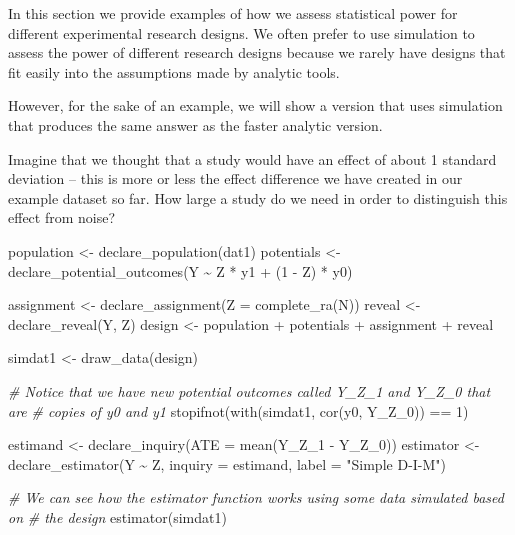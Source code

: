\documentclass[
  12pt,
]{book}
\newenvironment{Shaded}{\begin{snugshade}}{\end{snugshade}}
\newcommand{\AttributeTok}[1]{\textcolor[rgb]{0.77,0.63,0.00}{#1}}
\newcommand{\CommentTok}[1]{\textcolor[rgb]{0.56,0.35,0.01}{\textit{#1}}}
\newcommand{\DecValTok}[1]{\textcolor[rgb]{0.00,0.00,0.81}{#1}}
\newcommand{\FunctionTok}[1]{\textcolor[rgb]{0.00,0.00,0.00}{#1}}
\newcommand{\NormalTok}[1]{#1}
\newcommand{\OtherTok}[1]{\textcolor[rgb]{0.56,0.35,0.01}{#1}}
\newcommand{\SpecialCharTok}[1]{\textcolor[rgb]{0.00,0.00,0.00}{#1}}
\newcommand{\StringTok}[1]{\textcolor[rgb]{0.31,0.60,0.02}{#1}}
\theoremstyle{definition}
\theoremstyle{definition}
\theoremstyle{definition}
\theoremstyle{remark}
\begin{document}
In this section we provide examples of how we assess statistical power
for different experimental research designs. We often prefer to use
simulation to assess the power of different research designs because we
rarely have designs that fit easily into the assumptions made by
analytic tools.

However, for the sake of an example, we will show a version that uses
simulation that produces the same answer as the faster analytic version.

Imagine that we thought that a study would have an effect of about 1
standard deviation -- this is more or less the effect difference we have
created in our example dataset so far. How large a study do we need in
order to distinguish this effect from noise?

\begin{Shaded}
\begin{Highlighting}[]
\NormalTok{population }\OtherTok{\textless{}{-}} \FunctionTok{declare\_population}\NormalTok{(dat1)}
\NormalTok{potentials }\OtherTok{\textless{}{-}} \FunctionTok{declare\_potential\_outcomes}\NormalTok{(Y }\SpecialCharTok{\textasciitilde{}}\NormalTok{ Z }\SpecialCharTok{*}\NormalTok{ y1 }\SpecialCharTok{+}\NormalTok{ (}\DecValTok{1} \SpecialCharTok{{-}}\NormalTok{ Z) }\SpecialCharTok{*}\NormalTok{ y0)}

\NormalTok{assignment }\OtherTok{\textless{}{-}} \FunctionTok{declare\_assignment}\NormalTok{(}\AttributeTok{Z =} \FunctionTok{complete\_ra}\NormalTok{(N))}
\NormalTok{reveal }\OtherTok{\textless{}{-}} \FunctionTok{declare\_reveal}\NormalTok{(Y, Z)}
\NormalTok{design }\OtherTok{\textless{}{-}}\NormalTok{ population }\SpecialCharTok{+}\NormalTok{ potentials }\SpecialCharTok{+}\NormalTok{ assignment }\SpecialCharTok{+}\NormalTok{ reveal}

\NormalTok{simdat1 }\OtherTok{\textless{}{-}} \FunctionTok{draw\_data}\NormalTok{(design)}

\CommentTok{\# Notice that we have new potential outcomes called Y\_Z\_1 and Y\_Z\_0 that are}
\CommentTok{\# copies of y0 and y1}
\FunctionTok{stopifnot}\NormalTok{(}\FunctionTok{with}\NormalTok{(simdat1, }\FunctionTok{cor}\NormalTok{(y0, Y\_Z\_0)) }\SpecialCharTok{==} \DecValTok{1}\NormalTok{)}

\NormalTok{estimand }\OtherTok{\textless{}{-}} \FunctionTok{declare\_inquiry}\NormalTok{(}\AttributeTok{ATE =} \FunctionTok{mean}\NormalTok{(Y\_Z\_1 }\SpecialCharTok{{-}}\NormalTok{ Y\_Z\_0))}
\NormalTok{estimator }\OtherTok{\textless{}{-}} \FunctionTok{declare\_estimator}\NormalTok{(Y }\SpecialCharTok{\textasciitilde{}}\NormalTok{ Z, }\AttributeTok{inquiry =}\NormalTok{ estimand, }\AttributeTok{label =} \StringTok{"Simple D{-}I{-}M"}\NormalTok{)}

\CommentTok{\# We can see how the estimator function works using some data simulated based on}
\CommentTok{\# the design}
\FunctionTok{estimator}\NormalTok{(simdat1)}
\end{Highlighting}
\end{Shaded}
\end{document}
